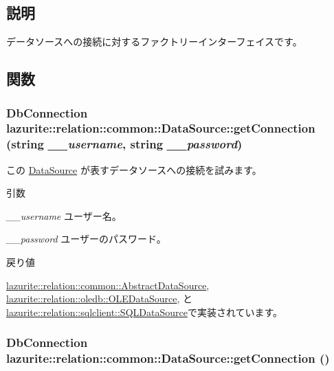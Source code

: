 \subsection{説明}
データソースへの接続に対するファクトリーインターフェイスです。 

\subsection{関数}
\hypertarget{interfacelazurite_1_1relation_1_1common_1_1_data_source_a692379eb1733a5c36a25b141e6091a01}{
\subsubsection[{getConnection}]{\setlength{\rightskip}{0pt plus 5cm}DbConnection lazurite::relation::common::DataSource::getConnection (string {\em \_\-\_\-username}, \/  string {\em \_\-\_\-password})}}
\label{interfacelazurite_1_1relation_1_1common_1_1_data_source_a692379eb1733a5c36a25b141e6091a01}


この \hyperlink{interfacelazurite_1_1relation_1_1common_1_1_data_source}{DataSource} が表すデータソースへの接続を試みます。 
\begin{DoxyParams}{引数}
\item[{\em \_\-\_\-username}]ユーザー名。\item[{\em \_\-\_\-password}]ユーザーのパスワード。\end{DoxyParams}
\begin{DoxyReturn}{戻り値}

\end{DoxyReturn}


\hyperlink{classlazurite_1_1relation_1_1common_1_1_abstract_data_source_a1e828b5e7c1e29b21439d910f05005aa}{lazurite::relation::common::AbstractDataSource}, \hyperlink{classlazurite_1_1relation_1_1oledb_1_1_o_l_e_data_source_a8bcb0954e47ca8ec4c117ade3e9f0ce9}{lazurite::relation::oledb::OLEDataSource}, と \hyperlink{classlazurite_1_1relation_1_1sqlclient_1_1_s_q_l_data_source_a49e9bb60b11cb3d984257702a566e869}{lazurite::relation::sqlclient::SQLDataSource}で実装されています。\hypertarget{interfacelazurite_1_1relation_1_1common_1_1_data_source_a463c3bbeedcd8a6332ec0a87eb530a3c}{
\subsubsection[{getConnection}]{\setlength{\rightskip}{0pt plus 5cm}DbConnection lazurite::relation::common::DataSource::getConnection ()}}
\label{interfacelazurite_1_1relation_1_1common_1_1_data_source_a463c3bbeedcd8a6332ec0a87eb530a3c}


